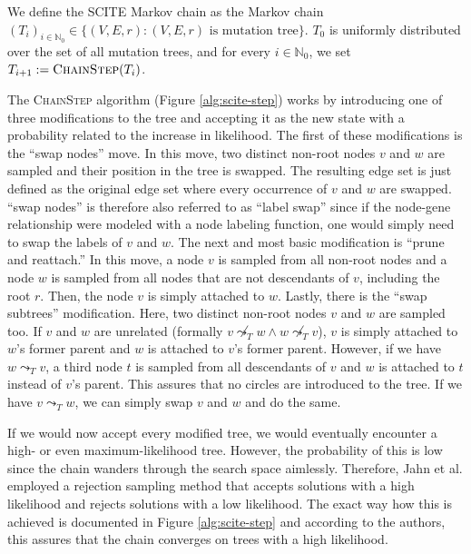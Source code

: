 \begin{definition}
    We define the \ac{SCITE} Markov chain as the Markov chain $(T_i)_{i \in \mathbb{N}_0} \in \{(V, E, r) : (V, E, r) \text{ is mutation tree}\}$. $T_0$ is uniformly distributed over the set of all mutation trees, and for every $i \in \mathbb{N}_0$, we set $T_{i+1} := \textsc{ChainStep}(T_i)$.
\end{definition}

The \textsc{ChainStep} algorithm (Figure \ref{alg:scite-step}) works by introducing one of three modifications to the tree and accepting it as the new state with a probability related to the increase in likelihood. The first of these modifications is the ``swap nodes'' move. In this move, two distinct non-root nodes $v$ and $w$ are sampled and their position in the tree is swapped. The resulting edge set is just defined as the original edge set where every occurrence of $v$ and $w$ are swapped. ``swap nodes'' is therefore also referred to as ``label swap'' since if the node-gene relationship were modeled with a node labeling function, one would simply need to swap the labels of $v$ and $w$. The next and most basic modification is ``prune and reattach.'' In this move, a node $v$ is sampled from all non-root nodes and a node $w$ is sampled from all nodes that are not descendants of $v$, including the root $r$. Then, the node $v$ is simply attached to $w$. Lastly, there is the ``swap subtrees'' modification. Here, two distinct non-root nodes $v$ and $w$ are sampled too. If $v$ and $w$ are unrelated (formally $v \not\leadsto_T w \wedge w \not\leadsto_T v$), $v$ is simply attached to $w$'s former parent and $w$ is attached to $v$'s former parent. However, if we have $w \leadsto_T v$, a third node $t$ is sampled from all descendants of $v$ and $w$ is attached to $t$ instead of $v$'s parent. This assures that no circles are introduced to the tree. If we have $v \leadsto_T w$, we can simply swap $v$ and $w$ and do the same.

If we would now accept every modified tree, we would eventually encounter a high- or even maximum-likelihood tree. However, the probability of this is low since the chain wanders through the search space aimlessly. Therefore, Jahn et al. employed a rejection sampling method that accepts solutions with a high likelihood and rejects solutions with a low likelihood. The exact way how this is achieved is documented in Figure \ref{alg:scite-step} and according to the authors, this assures that the chain converges on trees with a high likelihood.
    
